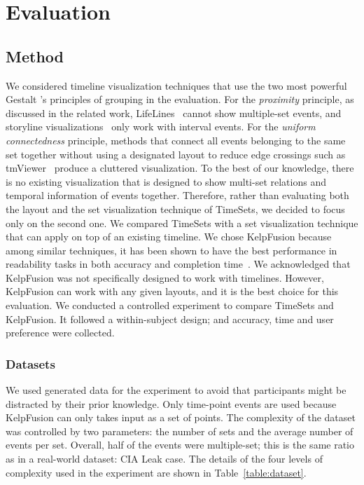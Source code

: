 \section{Evaluation}

\subsection{Method}
We considered timeline visualization techniques that use the two most powerful Gestalt 's principles of grouping in the evaluation. For the \emph{proximity} principle, as discussed in the related work, LifeLines~\cite{Plaisant1996a} cannot show multiple-set events, and storyline visualizations~\cite{Liu2013} only work with interval events. For the \emph{uniform connectedness} principle, methods that connect all events belonging to the same set together without using a designated layout to reduce edge crossings such as tmViewer~\cite{Kumar1998} produce a cluttered visualization. To the best of our knowledge, there is no existing visualization that is designed to show multi-set relations and temporal information of events together. Therefore, rather than evaluating both the layout and the set visualization technique of TimeSets, we decided to focus only on the second one. We compared TimeSets with a set visualization technique that can apply on top of an existing timeline. We chose KelpFusion because among similar techniques, it has been shown to have the best performance in readability tasks in both accuracy and completion time~\cite{Meulemans2013}. We acknowledged that KelpFusion was not specifically designed to work with timelines. However, KelpFusion can work with any given layouts, and it is the best choice for this evaluation. We conducted a controlled experiment to compare TimeSets and KelpFusion. It followed a within-subject design; and accuracy, time and user preference were collected.
 
\subsubsection{Datasets}
We used generated data for the experiment to avoid that participants might be distracted by their prior knowledge. Only time-point events are used because KelpFusion can only takes input as a set of points. The complexity of the dataset was controlled by two parameters: the number of sets and the average number of events per set. Overall, half of the events were multiple-set; this is the same ratio as in a real-world dataset: CIA Leak case. The details of the four levels of complexity used in the experiment are shown in Table~\ref{table:dataset}.

